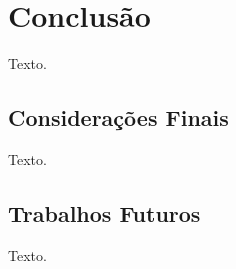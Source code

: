 \chapter{Conclusão}
\label{sec-conclusoes}

Texto.


\section{Considerações Finais}
\label{sec-conclusoes-consideracoes}

Texto.


\section{Trabalhos Futuros}
\label{sec-conclusoes-trabalhosfuturos}

Texto.
